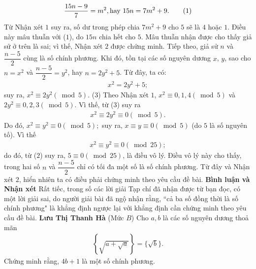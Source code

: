 \begin{multicols}{2}
	\begin{align*}
		\frac{{15n - 9}}{7} = {m^2}, \text{\color{
	black} hay } 15n = 7{m^2} + 9. \tag{$1$}
	\end{align*}
	Từ Nhận xét $1$ suy ra, số dư trong phép chia $7m^2 + 9$  cho $5$ sẽ là $4$ hoặc $1$. Điều này mâu thuẫn với ($1$), do $15n$ chia hết cho $5$. Mâu thuẫn nhận được cho thấy giả sử ở trên là sai; vì thế, Nhận xét $2$ được chứng minh.
	\vskip 0.05cm
	Tiếp theo, giả sử $n$ và $\dfrac{n-5}{2}$  cùng là số chính phương. Khi đó, tồn tại các số nguyên dương $x$, $y$, sao cho $n = x^2$  và $\dfrac{n-5}{2} = y^2$,  hay \linebreak$n = 2y^2 + 5$.  Từ đây, ta có:
	\begin{align*}
		{x^2} = 2{y^2} + 5; \tag{$2$}
	\end{align*}
	suy ra, ${x^2} \equiv 2{y^2}\left( {\bmod 5} \right)$. \hfill ($3$)
	\vskip 0.05cm
	Theo Nhận xét $1$, ${x^2} \equiv 0,1,4\left( {\bmod 5} \right)$  và  $2{y^2} \equiv 0,2,3\left( {\bmod 5} \right)$.
	\vskip 0.05cm 
	Vì thế, từ ($3$) suy ra
	\begin{align*}
		{x^2} \equiv 2{y^2} \equiv 0\left( {\bmod 5} \right).
	\end{align*}
	Do đó, ${x^2} \equiv {y^2} \equiv 0\left( {\bmod 5} \right);$  suy ra, \linebreak $x \equiv y \equiv 0\left( {\bmod 5} \right)$  (do $5$ là số nguyên tố). Vì thế
	\begin{align*}
		{x^2} \equiv {y^2} \equiv 0\left( {\bmod 25} \right);
	\end{align*}
	do đó, từ ($2$) suy ra,  $5 \equiv 0\left( {\bmod 25} \right)$, là điều vô lý. Điều vô lý này cho thấy, trong hai số $n$ và $\dfrac{n-5}{2}$  chỉ có tối đa một số là số chính phương. Từ đây và Nhận xét $2$, hiển nhiên ta có điều phải chứng minh theo yêu cầu đề bài.
	\vskip 0.05cm
	\textbf{\color{thachthuctoanhoc}Bình luận và Nhận xét}
	\vskip 0.05cm
	Rất tiếc, trong số các lời giải Tạp chí đã nhận được từ bạn đọc, có một lời giải sai, do người giải bài đã ngộ nhận rằng, ``cả ba số đồng thời là số chính phương" là khẳng định ngược lại với khẳng định cần chứng minh theo yêu cầu đề bài.
	\vskip 0.05cm
	\hfill	\textbf{\color{thachthuctoanhoc}Lưu Thị Thanh Hà}
	\vskip 0.05cm
	{}
	(Mức $B$) Cho $a,b$ là các số nguyên dương thoả mãn
	\begin{align*}
		\left\{ \sqrt{a+\sqrt{a}}\right\}=\{\sqrt b\}.
	\end{align*}
	Chứng minh rằng, $4b+1$ là một số chính phương.

\end{multicols}

